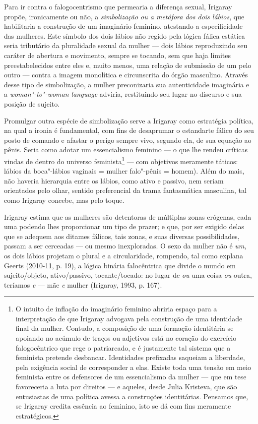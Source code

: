 Para ir contra o falogocentrismo que permearia a diferença sexual,
Irigaray propõe, ironicamente ou não, a \emph{simbolização ou a metáfora
dos dois lábios}, que habilitaria a construção de um imaginário
feminino, atestando a especificidade das mulheres. Este símbolo dos dois
lábios não regido pela lógica fálica estática seria tributário da
pluralidade sexual da mulher --- dois lábios reproduzindo seu caráter de
abertura e movimento, sempre se tocando, sem que haja limites
preestabelecidos entre eles e, muito menos, uma relação de submissão de
um pelo outro --- contra a imagem monolítica e circunscrita do órgão
masculino. Através desse tipo de simbolização, a mulher preconizaria sua
autenticidade imaginária e a \emph{woman"-to"-woman language} adviria,
restituindo seu lugar no discurso e sua posição de sujeito.

Promulgar outra espécie de simbolização serve a Irigaray como estratégia
política, na qual a ironia é fundamental, com fins de desaprumar o
estandarte fálico do seu posto de comando e afastar o perigo sempre
vivo, segundo ela, de sua equação ao pênis. Seria como adotar um
essencialismo feminino --- o que lhe rendeu críticas vindas de dentro do
universo feminista\footnote{O intuito de inflação do imaginário feminino
  abriria espaço para a interpretação de que Irigaray advogava pela
  construção de uma identidade final da mulher. Contudo, a composição de
  uma formação identitária se apoiando no acúmulo de traços ou adjetivos
  está no coração do exercício falogocêntrico que rege o patriarcado, e
  é justamente tal sistema que a feminista pretende desbancar.
  Identidades prefixadas saqueiam a liberdade, pela exigência social de
  corresponder a elas. Existe toda uma tensão em meio feminista entre os
  defensores de um essencialismo da mulher --- que em tese favoreceria a
  luta por direitos --- e aqueles, desde Julia Kristeva, que são
  entusiastas de uma política avessa a construções identitárias.
  Pensamos que, se Irigaray credita essência ao feminino, isto se dá com
  fins meramente estratégicos.} --- com objetivos meramente táticos:
lábios da boca"-lábios vaginais = mulher  falo"-pênis = homem). Além do
mais, não haveria hierarquia entre os lábios, como ativo e passivo, nem
seriam orientados pelo olhar, sentido preferencial da trama fantasmática
masculina, tal como Irigaray concebe, mas pelo toque.

Irigaray estima que as mulheres são detentoras de múltiplas zonas
erógenas, cada uma podendo lhes proporcionar um tipo de prazer; e que,
por ser exigido delas que se adequem aos ditames fálicos, tais zonas, e
suas diversas possibilidades, passam a ser cerceadas --- ou mesmo
inexploradas. O sexo da mulher não é \emph{um}, os dois lábios projetam
o plural e a circularidade, rompendo, tal como explana Geerts (2010-11,
p. 19), a lógica binária falocêntrica que divide o mundo em
sujeito/objeto, ativo/passivo, tocante/tocado: no lugar de \emph{ou} uma
coisa \emph{ou} outra, teríamos \emph{e} --- mãe \emph{e} mulher
(Irigaray, 1993, p. 167).

